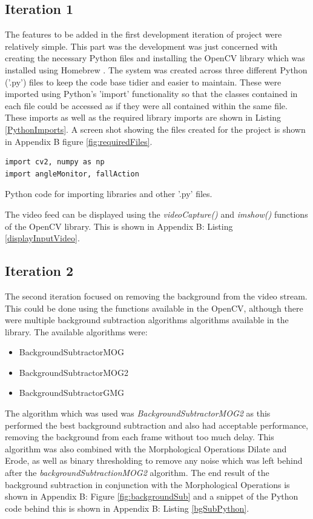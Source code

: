 \documentclass[11pt,a4paper]{report}
\begin{document}
\subsection{Iteration 1}

The features to be added in the first development iteration of project were relatively simple. This part was the development was just concerned with creating the necessary Python files and installing the OpenCV library which was installed using Homebrew \citep{Homebrew}. The system was created across three different Python ('.py') files to keep the code base tidier and easier to maintain. These were imported using Python's 'import' functionality so that the classes contained in each file could be accessed as if they were all contained within the same file. These imports as well as the required library imports are shown in Listing \ref{PythonImports}. A screen shot showing the files created for the project is shown in Appendix B figure \ref{fig:requiredFiles}. 

\begin{listing}
\begin{verbatim}
import cv2, numpy as np
import angleMonitor, fallAction
\end{verbatim}
\caption{Python code for importing libraries and other '.py' files.}
\label{PythonImports}
\end{listing}

The video feed can be displayed using the \textit{videoCapture()} and \textit{imshow()} functions of the OpenCV library. This is shown in Appendix B: Listing \ref{displayInputVideo}.

\subsection{Iteration 2}

The second iteration focused on removing the background from the video stream. This could be done using the functions available in the OpenCV, although there were multiple background subtraction algorithms algorithms available in the library. The available algorithms were:

\begin{itemize}
  \item BackgroundSubtractorMOG
  \item BackgroundSubtractorMOG2
  \item BackgroundSubtractorGMG
\end{itemize}

The algorithm which was used was \textit{BackgroundSubtractorMOG2} as this performed the best background subtraction and also had acceptable performance, removing the background from each frame without too much delay. This algorithm was also combined with the Morphological Operations Dilate and Erode, as well as binary thresholding to remove any noise which was left behind after the \textit{backgroundSubtractionMOG2} algorithm. The end result of the background subtraction in conjunction with the Morphological Operations is shown in Appendix B: Figure \ref{fig:backgroundSub} and a snippet of the Python code behind this is shown in Appendix B: Listing \ref{bgSubPython}.
\end{document}

